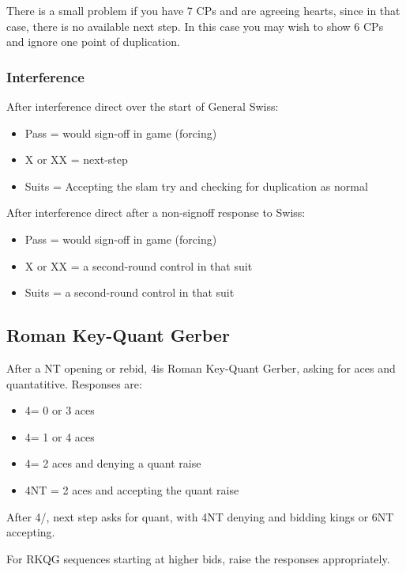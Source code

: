 \documentclass[a4paper,14pt]{extarticle}
\begin{document}
There is a small problem if you have 7 CPs and are agreeing hearts, since in
that case, there is no available next step. In this case you may wish to show
6 CPs and ignore one point of duplication.

\subsubsection{Interference}

After interference direct over the start of General Swiss:

\begin{itemize}
	\item Pass = would sign-off in game (forcing)
	\item X or XX = next-step
	\item Suits = Accepting the slam try and checking for duplication as normal
\end{itemize}

After interference direct after a non-signoff response to Swiss:

\begin{itemize}
	\item Pass = would sign-off in game (forcing)
	\item X or XX = a second-round control in that suit
	\item Suits = a second-round control in that suit
\end{itemize}

\subsection{Roman Key-Quant Gerber}
\label{sec:rkqg}
\label{note:22}

After a NT opening or rebid, 4\clubs is Roman Key-Quant Gerber, asking for
aces and quantatitive. Responses are:

\begin{itemize}
	\item 4\diamonds = 0 or 3 aces
	\item 4\hearts = 1 or 4 aces
	\item 4\spades = 2 aces and denying a quant raise
	\item 4NT = 2 aces and accepting the quant raise
\end{itemize}

After 4\diamonds/\hearts, next step asks for quant, with 4NT denying
and bidding kings or 6NT accepting.

For RKQG sequences starting at higher bids, raise the responses appropriately.
\end{document}
